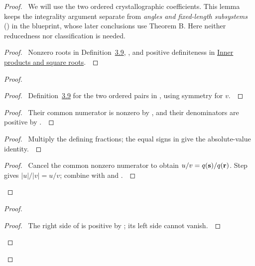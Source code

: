 \documentclass[11pt]{amsart}
\let\qed\relax
\newcommand\ints{{\mathbb Z}}
\begin{document}
\begin{proof}
\pfsketch\ We will use the two ordered crystallographic coefficients.
This lemma keeps the integrality argument separate from
\emph{angles and fixed-length subsystems} () in the
blueprint, whose later conclusions use Theorem B. Here neither
reducedness nor classification is needed.
\begin{proof}\pf\ Nonzero roots in Definition~\hyperref[def:3.9]{3.9}, ,
and positive definiteness in
\hyperref[facts:312-inner]{Inner products and square roots}.~\qed\end{proof}
\begin{proof}
 \step{t312lengthIntegral}{$u,v\in\ints$.}
 \begin{proof}\pf\ Definition~\hyperref[def:3.9]{3.9} for the two ordered pairs
 in , using symmetry for $v$.~\qed\end{proof}
 \begin{proof}\pf\ Their common numerator is nonzero by ,
 and their denominators are positive by .~\qed\end{proof}
 \begin{proof}\pf\ Multiply the defining fractions; the equal signs in
  give the absolute-value identity.~\qed\end{proof}
 \qedstep
 \begin{proof}\pf\ Cancel the common nonzero numerator to obtain
 $u/v=q({\mathbf s})/q({\mathbf r})$. Step  gives
 $|u|/|v|=u/v$; combine with 
 and .~\qed\end{proof}
\end{proof}
\begin{proof}
 \begin{proof}\pf\ The right side of  is positive by
 ; its left side cannot vanish.~\qed\end{proof}

\end{proof}
\end{proof}
\end{document}

